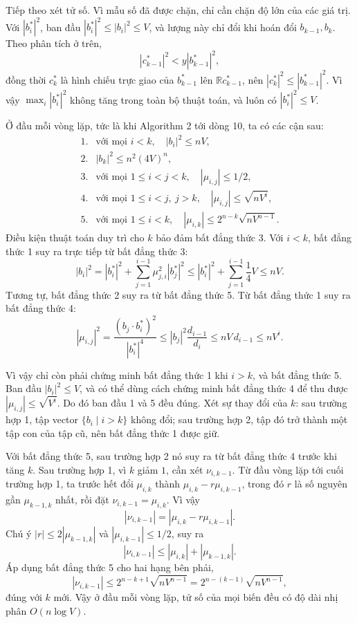 \documentclass[11pt]{article}
\begin{document}
Tiếp theo xét tử số. Vì mẫu số đã được chặn, chỉ cần chặn độ lớn của các giá
trị. Với \(|b_i^*|^2\), ban đầu \(|b_i^*|^2\le |b_i|^2\le V\), và lượng này
chỉ đổi khi hoán đổi \(b_{k-1},b_k\). Theo phân tích ở trên,
\[
  |c_{k-1}^*|^2<y|b_{k-1}^*|^2,
\]
đồng thời \(c_k^*\) là hình chiếu trực giao của \(b_{k-1}^*\) lên
\(\mathbb R c_{k-1}^*\), nên \(|c_k^*|^2\le |b_{k-1}^*|^2\). Vì vậy
\(\max_i |b_i^*|^2\) không tăng trong toàn bộ thuật toán, và luôn có
\(|b_i^*|^2\le V\).

Ở đầu mỗi vòng lặp, tức là khi Algorithm 2 tới dòng 10, ta có các cận sau:
\[
\begin{array}{ll}
1.& \text{với mọi } i<k,\quad |b_i|^2\le nV,\\
2.& |b_k|^2\le n^2(4V)^n,\\
3.& \text{với mọi } 1\le i<j<k,\quad |\mu_{i,j}|\le 1/2,\\
4.& \text{với mọi } 1\le i<j,\ j>k,\quad |\mu_{i,j}|\le \sqrt{nV^i},\\
5.& \text{với mọi } 1\le i<k,\quad |\mu_{i,k}|\le 2^{n-k}\sqrt{nV^{n-1}}.
\end{array}
\]
Điều kiện thuật toán duy trì cho \(k\) bảo đảm bất đẳng thức 3. Với \(i<k\),
bất đẳng thức 1 suy ra trực tiếp từ bất đẳng thức 3:
\[
  |b_i|^2=|b_i^*|^2+\sum_{j=1}^{i-1}\mu_{j,i}^2|b_j^*|^2
  \le |b_i^*|^2+\sum_{j=1}^{i-1}\frac14V\le nV.
\]
Tương tự, bất đẳng thức 2 suy ra từ bất đẳng thức 5. Từ bất đẳng thức 1 suy ra
bất đẳng thức 4:
\[
  |\mu_{i,j}|^2
  =\frac{(b_j\cdot b_i^*)^2}{|b_i^*|^4}
  \le |b_j|^2\frac{d_{i-1}}{d_i}
  \le nV\,d_{i-1}\le nV^i.
\]

Vì vậy chỉ còn phải chứng minh bất đẳng thức 1 khi \(i>k\), và bất đẳng thức
5. Ban đầu \(|b_i|^2\le V\), và có thể dùng cách chứng minh bất đẳng thức 4 để
thu được \(|\mu_{i,j}|\le \sqrt{V^i}\). Do đó ban đầu 1 và 5 đều đúng. Xét sự
thay đổi của \(k\): sau trường hợp 1, tập vector \(\{b_i\mid i>k\}\) không
đổi; sau trường hợp 2, tập đó trở thành một tập con của tập cũ, nên bất đẳng
thức 1 được giữ.

Với bất đẳng thức 5, sau trường hợp 2 nó suy ra từ bất đẳng thức 4 trước khi
tăng \(k\). Sau trường hợp 1, vì \(k\) giảm \(1\), cần xét \(\nu_{i,k-1}\).
Từ đầu vòng lặp tới cuối trường hợp 1, ta trước hết đổi
\(\mu_{i,k}\) thành \(\mu_{i,k}-r\mu_{i,k-1}\), trong đó \(r\) là số nguyên
gần \(\mu_{k-1,k}\) nhất, rồi đặt \(\nu_{i,k-1}=\mu_{i,k}\). Vì vậy
\[
  |\nu_{i,k-1}|=|\mu_{i,k}-r\mu_{i,k-1}|.
\]
Chú ý \(|r|\le2|\mu_{k-1,k}|\) và \(|\mu_{i,k-1}|\le1/2\), suy ra
\[
  |\nu_{i,k-1}|\le |\mu_{i,k}|+|\mu_{k-1,k}|.
\]
Áp dụng bất đẳng thức 5 cho hai hạng bên phải,
\[
  |\nu_{i,k-1}|\le 2^{n-k+1}\sqrt{nV^{n-1}}
  =2^{n-(k-1)}\sqrt{nV^{n-1}},
\]
đúng với \(k\) mới. Vậy ở đầu mỗi vòng lặp, tử số của mọi biến đều có độ dài
nhị phân \(O(n\log V)\).
\end{document}
